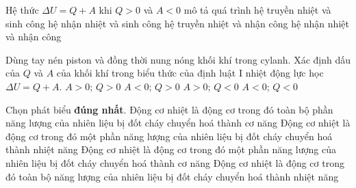 	\begin{ex}
			Hệ thức $\Delta U=Q+A$ khi $Q>0$ và $A<0$ mô tả quá trình
		\choice
		{hệ truyền nhiệt và sinh công}
		{\True hệ nhận nhiệt và sinh công}
		{hệ truyền nhiệt và nhận công}
		{hệ nhận nhiệt và nhận công}
		\loigiai{ }
	\end{ex}
		\begin{ex}
			Dùng tay nén piston và đồng thời nung nóng khối khí trong cylanh. Xác định dấu của $Q$ và $A$ của khối khí trong biểu thức của định luật I nhiệt động lực học $\Delta U=Q+A$.
		\choice
		{\True $A>0$; $Q>0$}
		{$A<0$; $Q>0$}
		{$A>0$; $Q<0$}
		{$A<0$; $Q<0$}
		\loigiai{ }
	\end{ex}
		\begin{ex}
		Chọn phát biểu \textbf{đúng nhất}.
	\choice
	{Động cơ nhiệt là động cơ trong đó toàn bộ phần năng lượng của nhiên liệu bị đốt cháy chuyển hoá thành cơ năng}
	{Động cơ nhiệt là động cơ trong đó một phần năng lượng của nhiên liệu bị đốt cháy chuyển hoá thành nhiệt năng}
	{\True Động cơ nhiệt là động cơ trong đó một phần năng lượng của nhiên liệu bị đốt cháy chuyển hoá thành cơ năng}
	{Động cơ nhiệt là động cơ trong đó toàn bộ năng lượng của nhiên liệu bị đốt cháy chuyển hoá thành nhiệt năng}
	\loigiai{ }
\end{ex}

